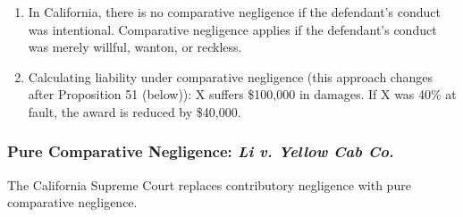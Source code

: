 \begin{enumerate}
    \item In California, there is no comparative negligence if the defendant's 
    conduct was intentional. Comparative negligence applies if the defendant's 
    conduct was merely willful, wanton, or reckless.
    \item Calculating liability under comparative negligence (this approach 
    changes after Proposition 51 (below)): X suffers \$100,000 in damages. If X 
    was 40\% at fault, the award is reduced by \$40,000.
\end{enumerate}

\subsubsection{Pure Comparative Negligence: \emph{Li v. Yellow Cab Co.}}

The California Supreme Court replaces contributory negligence with pure 
comparative negligence.

